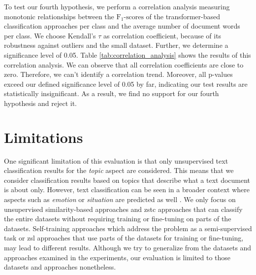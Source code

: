 \documentclass[sigconf]{acmart}
\begin{document}
To test our fourth hypothesis, we perform a correlation analysis measuring monotonic relationships between the $\text{F}_{1}\text{-scores}$ of the transformer-based classification approaches per class and the average number of document words per class. We choose Kendall's $\tau$ as correlation coefficient, because of its robustness against outliers and the small dataset. Further, we determine a significance level of 0.05. Table \ref{tab:correlation_analysis} shows the results of this correlation analysis. We can observe that all correlation coefficients are close to zero. Therefore, we can't identify a correlation trend. Moreover, all p-values exceed our defined significance level of 0.05 by far, indicating our test results are statistically insignificant. As a result, we find no support for our fourth hypothesis and reject it.

\section{Limitations}
One significant limitation of this evaluation is that only unsupervised text classification results for the \textit{topic} aspect are considered. This means that we consider classification results based on topics that describe what a text document is about only. However, text classification can be seen in a broader context where aspects such as \textit{emotion} or \textit{situation} are predicted as well \cite{yin-etal-2019-benchmarking}. We only focus on unsupervised similarity-based approaches and \ac{zstc} approaches that can classify the entire datasets without requiring training or fine-tuning on parts of the datasets. Self-training approaches which address the problem as a semi-supervised task or \ac{zsl} approaches that use parts of the datasets for training or fine-tuning, may lead to different results. Although we try to generalize from the datasets and approaches examined in the experiments, our evaluation is limited to those datasets and approaches nonetheless.
\end{document}
